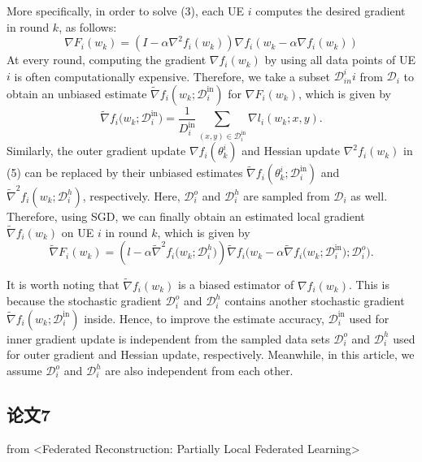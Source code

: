 More specifically, in order to solve (3), each UE $i$ computes the desired gradient in round $k$, as follows: 
\begin{equation*}
    \nabla F_i(w_k) = (I-\alpha \nabla^2f_i(w_k))\nabla f_i(w_k-\alpha\nabla f_i(w_k))
\end{equation*}
At every round, computing the gradient $\nabla f_i(w_k)$ by using all data points of UE $i$ is often computationally expensive. Therefore, we take a subset $\mathcal{D}^i_{in} i$ from $\mathcal{D}_i$ to obtain an unbiased estimate $\tilde{\nabla}f_i(w_k;\mathcal{D}_i^{\mathrm{in}})$ for $\nabla F_i(w_k)$, which is given by
\begin{equation*}
    \tilde{\nabla}f_i\Big(w_k;\mathcal{D}_i^{\mathrm{in}}\Big)=\frac1{D_i^{\mathrm{in}}}\sum_{(x,y)\in\mathcal{D}_i^{\mathrm{in}}}\nabla l_i(w_k;x,y).
\end{equation*}
Similarly, the outer gradient update $\nabla f_i(\theta^i_k)$ and Hessian update $\nabla^2 f_i(w_k)$ in (5) can be replaced by their unbiased estimates $\tilde{\nabla}f_i(\theta_k^i;\mathcal{D}_i^{\mathrm{in}})$ and\\ $\tilde{\nabla}^2f_i(w_k;\mathcal{D}_i^h)$, respectively. Here, $\mathcal{D}_i^o$ and $\mathcal{D}_i^h$ are sampled from $\mathcal{D}_i$ as well. Therefore, using SGD, we can finally obtain an estimated local gradient $\tilde{\nabla}f_i(w_k)$ on UE $i$ in round $k$, which is given by
\begin{equation*}
    \tilde{\nabla}F_i(w_k)=\left(l-\alpha\tilde{\nabla}^2f_i\Big(w_k;\mathcal{D}_i^h\Big)\right)\tilde{\nabla}f_i\Big(w_k-\alpha\tilde{\nabla}f_i\Big(w_k;\mathcal{D}_i^{\mathrm{in}}\Big);\mathcal{D}_i^o\Big).
\end{equation*}

It is worth noting that $\tilde{\nabla}f_i(w_k)$ is a biased estimator of $\nabla f_i(w_k)$. This is because the stochastic gradient $\mathcal{D}_i^o$ and $\mathcal{D}_i^h$ contains another stochastic gradient $\tilde{\nabla}f_i(w_k;\mathcal{D}_i^\mathrm{in})$ inside. Hence, to improve the estimate accuracy, $\mathcal{D}_i^\mathrm{in}$ used for inner gradient update is independent from the sampled data sets $\mathcal{D}_i^o$ and $\mathcal{D}_i^h$ used for outer gradient and Hessian update, respectively. Meanwhile, in this article, we assume $\mathcal{D}_i^o$ and $\mathcal{D}_i^h$ are also independent from each other.
\subsection{论文7}
from <Federated Reconstruction: Partially Local Federated Learning>

